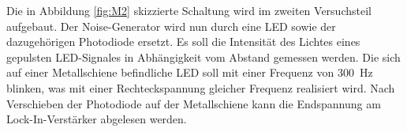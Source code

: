 Die in Abbildung \ref{fig:M2} skizzierte Schaltung wird im zweiten Versuchsteil aufgebaut. 
Der Noise-Generator wird nun durch eine LED sowie der dazugehörigen Photodiode ersetzt. 
Es soll die Intensität des Lichtes eines gepulsten LED-Signales in Abhängigkeit vom Abstand gemessen werden.
Die sich auf einer Metallschiene befindliche LED soll mit einer Frequenz von \SI{300}{\hertz} blinken, was mit einer Rechteckspannung gleicher Frequenz realisiert wird. 
Nach Verschieben der Photodiode auf der Metallschiene kann die Endspannung am Lock-In-Verstärker abgelesen werden.
